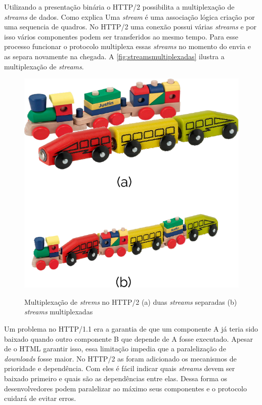 Utilizando a presentação binária o HTTP/2 possibilita a multiplexação de \textit{streams} de dados. Como explica \cite{HTTP2Explained} Uma \textit{stream} é uma associação lógica criação por uma sequencia de quadros. No HTTP/2 uma conexão possui várias \textit{streams} e por isso vários componentes podem ser transferidos ao mesmo tempo. Para esse processo funcionar o protocolo multiplexa essas \textit{streams} no momento do envia e as separa novamente na chegada. A \autoref{fig:streamsmultiplexadas} ilustra a multiplexação de \textit{streams}.

\begin{figure}[!htb]
    \centering
    \caption{Multiplexação de \textit{strems} no HTTP/2 (a) duas \textit{streams} separadas (b) \textit{streams} multiplexadas}
    \includegraphics[width=1.0\textwidth]{./04-figuras/fund-teorica/multiplexed_streams}
    \label{fig:streamsmultiplexadas}
\end{figure}

Um problema no HTTP/1.1 era a garantia de que um componente A já teria sido baixado quando outro componente B que depende de A fosse executado. Apesar de o HTML garantir isso, essa limitação impedia que a paralelização de \textit{downloads} fosse maior. No HTTP/2 as foram adicionado os mecanismos de prioridade e dependência. Com eles é fácil indicar quais \textit{streams} devem ser baixado primeiro e quais são as dependências entre elas. Dessa forma os desenvolvedores podem paralelizar ao máximo seus componentes e o protocolo cuidará de evitar erros. 

